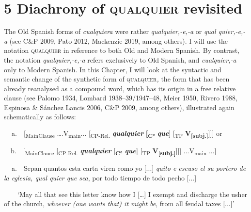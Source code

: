 \clearpage\section[5 Diachrony of qualquier revisited]{\textbf{5 Diachrony of }\textbf{\textsc{qualquier }}\textbf{revisited}}
\begin{styleStandard}
The Old Spanish forms of \textit{cualquiera} were rather \textit{qualquier,\nobreakdash-e,\nobreakdash-a} or \textit{qual quier,\nobreakdash-e,\nobreakdash-a} (see C\&P 2009, Pato 2012, Mackenzie 2019, among others). I will use the notation \textsc{qualquier} in reference to both Old and Modern Spanish\textsc{. }By contrast, the notation \textit{qualquier,\nobreakdash-e,\nobreakdash-a} refers exclusively to Old Spanish, and \textit{cualquier,-a} only to Modern Spanish. In this Chapter, I will look at the syntactic and semantic change of the synthetic form of \textsc{qualquier}\textit{,} the form that has been already reanalysed as a compound word, which has its origin in a free relative clause (see Palomo 1934, Lombard 1938–39/1947–48, Meier 1950, Rivero 1988, Espinosa \& Sánchez Lancis 2006, C\&P 2009, among others), illustrated again schematically as follows:
\end{styleStandard}

\begin{styleStandard}
\textbf{\ \ }a.\ \ [\textsubscript{MainClause} ….V\textsubscript{main}... [\textsubscript{CP-Rel.} \textbf{\textit{qualquier }}\textbf{[}\textbf{\textsubscript{C°}}\textbf{ }\textbf{\textit{que}}] [\textsubscript{TP} \textbf{V}\textbf{\textsubscript{[subj.]}}]]] or 
\end{styleStandard}

\begin{styleStandard}
\ \ b.\ \ [\textsubscript{MainClause} [\textsubscript{CP-Rel.} \textbf{\textit{qualquier }}[\textbf{\textsubscript{C°}}\textbf{ }\textbf{\textit{que}}] [\textsubscript{TP} \textbf{V}\textbf{\textsubscript{[subj.]}}]]] ...V\textsubscript{main} ...]
\end{styleStandard}

\begin{styleStandard}
\textbf{\ \ }a.\ \ Sepan quantos esta carta viren como yo [...] \textit{quito e escuso el su portero de la eglesia, qual quier que sea}, por todo tiempo de todo pecho [...] 
\end{styleStandard}

\begin{styleStandard}
\ \ \ \ ‘May all that see this letter know how I […] I exempt and discharge the usher of the church, \textit{whoever (one wants that) it might be}, from all feudal taxes [...]’
\end{styleStandard}

